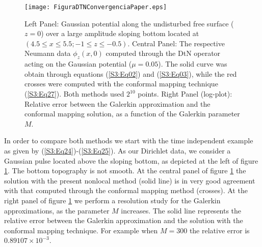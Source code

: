 \begin{figure}
\centerline{\texttt{[image: FiguraDTNConvergenciaPaper.eps]}}
\caption{Left Panel: Gaussian potential along the undisturbed free surface  ($z=0$) over a large amplitude sloping bottom
located at $(4.5\leq x\leq5.5; -1\leq z \leq -0.5)$. Central Panel: 
The respective Neumann data $\phi_z(x,0)$ computed through the DtN operator acting on the Gaussian potential ($\mu = 0.05$). The 
solid curve was obtain through equations (\ref{S3:Eq02}) and (\ref{S3:Eq03}), while the red crosses were computed with the conformal mapping technique (\ref{S3:Eq27}). Both methods used $2^{10}$ points. Right Panel (log-plot): Relative error between the Galerkin approximation and the 
conformal mapping solution,  as a function of the Galerkin parameter $M$. }
\label{Fig01}
\end{figure}

In order to compare both methods we start with the time independent example as given by (\ref{S3:Eq24})-(\ref{S3:Eq25}). 
As our Dirichlet data, we consider a Gaussian pulse located above the sloping bottom, as 
depicted at the left of figure \ref{Fig01}. The bottom topography is not smooth.
At the central panel of figure \ref{Fig01} the solution with the present nonlocal method (solid line) is in very 
good agreement with that computed through the conformal mapping method (crosses). 
At the right panel of figure \ref{Fig01} we perform a resolution study for the Galerkin approximations, as the parameter $M$ increases. 
The solid line represents the relative error between the Galerkin approximation and the solution with the conformal mapping technique. 
For example  when $M = 300$ the relative error is $0.89107\times10^{-3}$. 
